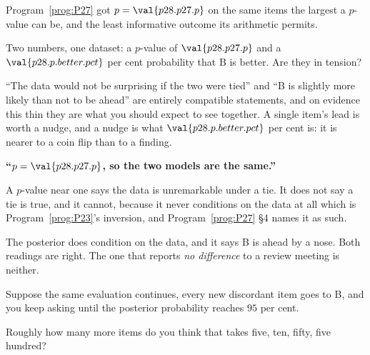 \begin{fr}
Program~\ref{prog:P27} got $p = \val{p28.p27.p}$ on the same items \dash{} the
largest a $p$-value can be, and the least informative outcome its arithmetic
permits.

Two numbers, one dataset: a $p$-value of $\val{p28.p27.p}$ and a
$\val{p28.p.better.pct}$ per cent probability that B is better. Are they in
tension?
\dotline
\nextframe
\end{fr}

\begin{fr}

\enquote{The data would not be surprising if the two were tied} and
\enquote{B is slightly more likely than not to be ahead} are entirely
compatible statements, and on evidence this thin they are what you should
expect to see together. A single item's lead is worth a nudge, and a nudge is
what $\val{p28.p.better.pct}$ per cent is: it is nearer to a coin flip than to
a finding.

\begin{trapbox}
\textbf{\enquote{$p = \val{p28.p27.p}$, so the two models are the same.}}

A $p$-value near one says the data is unremarkable under a tie. It does not say
a tie is true, and it cannot, because it never conditions on the data at all
\dash{} which is Program~\ref{prog:P23}'s inversion, and
Program~\ref{prog:P27} §4 names it as such.

The posterior does condition on the data, and it says B is ahead by a nose.
Both readings are right. The one that reports \emph{no difference} to a
review meeting is neither.
\end{trapbox}
\end{fr}

\begin{fr}
Suppose the same evaluation continues, every new discordant item goes to B,
and you keep asking until the posterior probability reaches $95$ per cent.

Roughly how many more items do you think that takes \dash{} five, ten, fifty,
five hundred?
\dotline
\nextframe
\end{fr}

